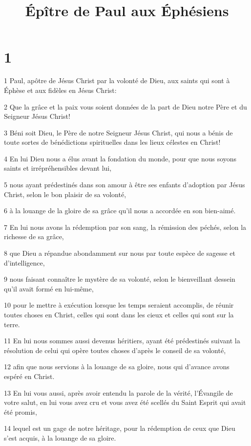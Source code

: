 

\title{Épître de Paul aux Éphésiens}


\chapter{1}

\par 1 Paul, apôtre de Jésus Christ par la volonté de Dieu, aux saints qui sont à Éphèse et aux fidèles en Jésus Christ:
\par 2 Que la grâce et la paix vous soient données de la part de Dieu notre Père et du Seigneur Jésus Christ!
\par 3 Béni soit Dieu, le Père de notre Seigneur Jésus Christ, qui nous a bénis de toute sortes de bénédictions spirituelles dans les lieux célestes en Christ!
\par 4 En lui Dieu nous a élus avant la fondation du monde, pour que nous soyons saints et irrépréhensibles devant lui,
\par 5 nous ayant prédestinés dans son amour à être ses enfants d'adoption par Jésus Christ, selon le bon plaisir de sa volonté,
\par 6 à la louange de la gloire de sa grâce qu'il nous a accordée en son bien-aimé.
\par 7 En lui nous avons la rédemption par son sang, la rémission des péchés, selon la richesse de sa grâce,
\par 8 que Dieu a répandue abondamment sur nous par toute espèce de sagesse et d'intelligence,
\par 9 nous faisant connaître le mystère de sa volonté, selon le bienveillant dessein qu'il avait formé en lui-même,
\par 10 pour le mettre à exécution lorsque les temps seraient accomplis, de réunir toutes choses en Christ, celles qui sont dans les cieux et celles qui sont sur la terre.
\par 11 En lui nous sommes aussi devenus héritiers, ayant été prédestinés suivant la résolution de celui qui opère toutes choses d'après le conseil de sa volonté,
\par 12 afin que nous servions à la louange de sa gloire, nous qui d'avance avons espéré en Christ.
\par 13 En lui vous aussi, après avoir entendu la parole de la vérité, l'Évangile de votre salut, en lui vous avez cru et vous avez été scellés du Saint Esprit qui avait été promis,
\par 14 lequel est un gage de notre héritage, pour la rédemption de ceux que Dieu s'est acquis, à la louange de sa gloire.
